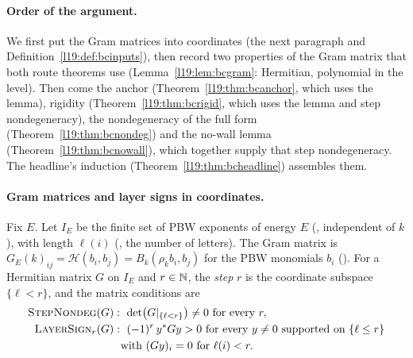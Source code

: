 \paragraph{Order of the argument.} We first put the Gram matrices into coordinates (the next paragraph and
Definition~\ref{l19:def:bcinputs}), then record two properties of the Gram matrix that both route theorems use
(Lemma~\ref{l19:lem:bcgram}: Hermitian, polynomial in the level). Then come the anchor
(Theorem~\ref{l19:thm:bcanchor}, which uses the lemma), rigidity (Theorem~\ref{l19:thm:bcrigid}, which uses the lemma and
step nondegeneracy), the nondegeneracy of the full form (Theorem~\ref{l19:thm:bcnondeg}) and the no-wall lemma
(Theorem~\ref{l19:thm:bcnowall}), which together supply that step nondegeneracy. The headline's induction
(Theorem~\ref{l19:thm:bcheadline}) assembles them.

\paragraph{Gram matrices and layer signs in coordinates.} Fix $E$. Let $I_E$ be the finite set of PBW exponents
of energy $E$ (, independent of $k$), with length $\ell(i)$ (, the number of letters).
The Gram matrix is $G_E(k)_{ij} = \mathcal H(b_i,b_j) = B_k(\rho_kb_i,b_j)$ for the PBW monomials $b_i$ (). For a
Hermitian matrix $G$ on $I_E$ and $r\in{\mathbb{N}}$, the \emph{step} $r$ is the coordinate subspace $\{\ell<r\}$, and the
matrix conditions are
\begin{align*}
  \textsc{StepNondeg}(G)&:\ \det\bigl(G|_{\{\ell<r\}}\bigr)\ne0\ \text{for every }r,\\
  \textsc{LayerSign}_r(G)&:\ (-1)^r\,y^*Gy>0\ \text{for every }y\ne0\text{ supported on }\{\ell\le r\}\\
  &\phantom{:\ }\text{with }(Gy)_i = 0\text{ for }\ell(i)<r.
\end{align*}

